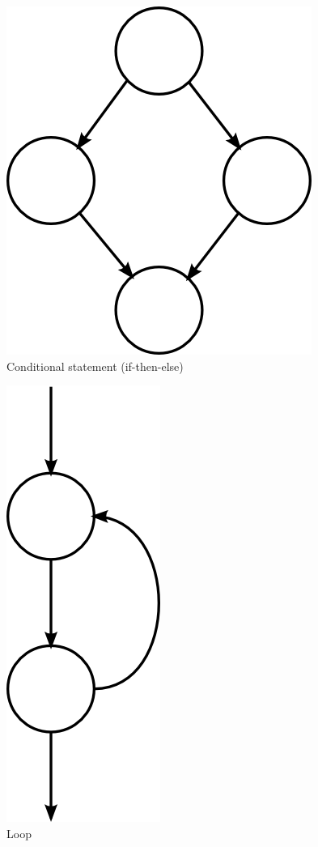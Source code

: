 \documentclass[12pt,twoside,notitlepage]{report}
\begin{document}
\begin{figure}[tbh]
\centerline{\includegraphics{figs/IfThenElse.png}}
\caption{\label{IfThenElse}Conditional statement (if-then-else)}
\end{figure}

\begin{figure}[tbh]
\centerline{\includegraphics{figs/Loop.png}}
\caption{\label{Loop}Loop}
\end{figure}
\end{document}
